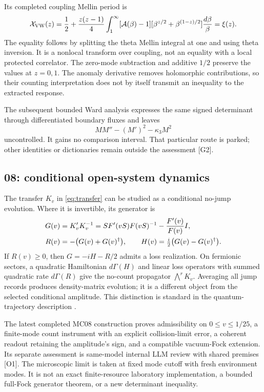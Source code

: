 \documentclass[11pt,letterpaper]{article}
\numberwithin{equation}{section}
\theoremstyle{remark}
\newcommand{\evid}[1]{\textsf{[#1]}}
\begin{document}
Its completed coupling Mellin period is
\begin{equation}
 \mathcal X_{\rm VW}(z)=\frac12+\frac{z(z-1)}4
 \int_1^\infty[\mathcal A(\beta)-1]
       [\beta^{z/2}+\beta^{(1-z)/2}]\frac{d\beta}{\beta}
 =\xi(z). \label{eq:period}
\end{equation}
The equality follows by splitting the theta Mellin integral at one
and using theta inversion. It is a nonlocal transform over coupling,
not an equality with a local protected correlator. The zero-mode
subtraction and additive $1/2$ preserve the values at $z=0,1$.
The anomaly derivative removes holomorphic contributions, so their
counting interpretation does not by itself transmit an inequality to
the extracted response.

The subsequent bounded Ward analysis expresses the same signed
determinant through differentiated boundary fluxes and leaves
\begin{equation}
 MM''-(M')^2-\kappa_3M^2
\end{equation}
uncontrolled. It gains no comparison interval. That particular route
is parked; other identities or dictionaries remain outside the
assessment \evid{G2}.

\subsection{08: conditional open-system dynamics}

The transfer $K_v$ in \eqref{eq:transfer} can be studied as a
conditional no-jump evolution. Where it is invertible, its generator is
\begin{align}
 G(v)&=K_v'K_v^{-1}
      =SF'(vS)F(vS)^{-1}-\frac{F'(v)}{F(v)}I,\notag\\
 R(v)&=-\bigl(G(v)+G(v)^\dagger\bigr),\qquad
 H(v)=\tfrac i2\bigl(G(v)-G(v)^\dagger\bigr).
 \label{eq:nj}
\end{align}
If $R(v)\ge0$, then $G=-iH-R/2$ admits a loss realization.
On fermionic sectors, a quadratic Hamiltonian $d\Gamma(H)$ and linear
loss operators with summed quadratic rate $d\Gamma(R)$ give the
no-count propagator $\bigwedge^r K_v$. Averaging all jump records
produces density-matrix evolution; it is a different object from the
selected conditional amplitude. This distinction is standard in the
quantum-trajectory description \cite{CastinDalibardMolmer08054002v1}.

The latest completed MC08 construction proves admissibility on
$0\le v\le1/25$, a finite-mode count instrument with an explicit
collision-limit error, a coherent readout retaining the amplitude's
sign, and a compatible vacuum-Fock extension. Its separate assessment
is same-model internal LLM review with shared premises \evid{O1}.
The microscopic limit is taken at fixed mode cutoff with fresh
environment modes. It is not an exact finite-resource laboratory
implementation, a bounded full-Fock generator theorem, or a new
determinant inequality.
\end{document}
